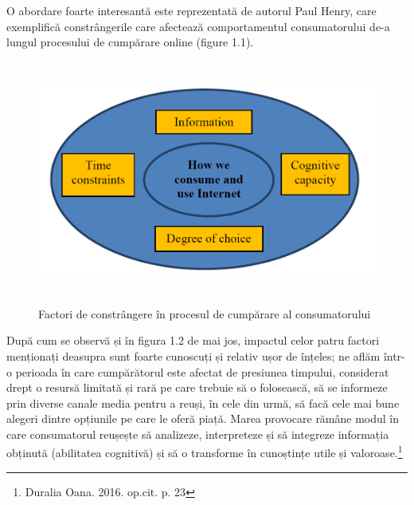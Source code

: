 \documentclass[a4paper, 12pt]{article}
\begin{document}
	\quad O abordare foarte interesantă este reprezentată de autorul Paul Henry, care exemplifică constrângerile care afectează comportamentul consumatorului de-a lungul procesului de cumpărare online (figure 1.1).
	\begin{figure}[!htb]
		\centering
		\includegraphics[width=13cm, height=8cm]{"figures/first.png"}
		\caption{Factori de constrângere în procesul de cumpărare al consumatorului}\label{fig:first}
	\end{figure}

	\quad După cum se observă și în figura 1.2 de mai jos, impactul celor patru factori menționați deasupra sunt foarte cunoscuți și relativ ușor de înțeles; ne aflăm într-o perioada în care cumpărătorul este afectat de presiunea timpului, considerat drept o resursă limitată și rară pe care trebuie să o folosească, să se informeze prin diverse canale media pentru a reuși, în cele din urmă, să facă cele mai bune alegeri dintre opțiunile pe care le oferă piață. Marea provocare rămâne modul în care consumatorul reușește să analizeze, interpreteze și să integreze informația obținută (abilitatea cognitivă) și să o transforme în cunoștințe utile și valoroase.\footnote{Duralia Oana. 2016. op.cit. p. 23}
	
\end{document}
